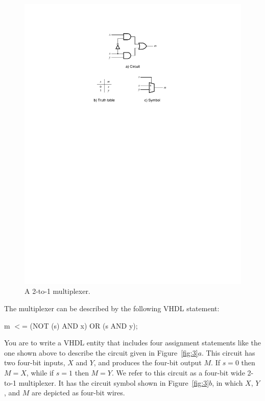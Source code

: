 \documentclass[epsfig,10pt,fullpage]{article}
\begin{document}
\begin{figure}[htb]
	\begin{center}
		\includegraphics[]{figures/figure2.pdf}
	\end{center}
	\caption{A 2-to-1 multiplexer.}
\label{fig:2}
\end{figure}


The multiplexer can be described by the following VHDL statement:

\begin{center}
\begin{minipage}[t]{12.5 cm}
\begin{tabbing}
m $<$= (NOT (s) AND x) OR (s AND y);
\end{tabbing}
\end{minipage}
\end{center}

You are to write a VHDL entity that includes four
assignment statements like the one shown above to describe the circuit given in Figure~\ref{fig:3}$a$.
This circuit has two four-bit inputs, $X$ and $Y$, and produces the four-bit output
$M$. If $s=0$ then $M = X$, while if $s=1$ then $M=Y$. We refer to this circuit as a four-bit
wide 2-to-1 multiplexer. It has the circuit symbol shown in Figure~\ref{fig:3}$b$, in which $X$,
$Y$, and $M$ are depicted as four-bit wires.
\end{document}
